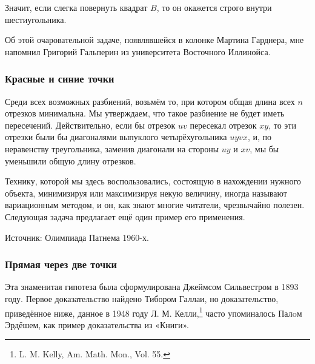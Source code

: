 Значит, если слегка повернуть квадрат $B$, то он окажется строго внутри шестиугольника.\heart

Об этой очаровательной задаче, появлявшейся в колонке Мартина Гарднера, мне напомнил Григорий Гальперин из университета Восточного Иллинойса.

\subsubsection*{Красные и синие точки}%

Среди всех возможных разбиений, возьмём то, при котором общая длина всех $n$ отрезков минимальна.
Мы утверждаем, что такое разбиение не будет иметь пересечений.
Действительно, если бы отрезок $uv$ пересекал отрезок $xy$, то эти отрезки были бы диагоналями выпуклого четырёхугольника $uyvx$, %
и, по неравенству треугольника, заменив диагонали на стороны $uy$ и $xv$, мы бы уменьшили общую длину отрезков.\heart

Технику, которой мы здесь воспользовались, состоящую в нахождении нужного объекта, минимизируя или максимизируя некую величину, иногда называют вариационным методом, и он, как знают многие читатели, чрезвычайно полезен.
Следующая задача предлагает ещё один пример его применения.

Источник: Олимпиада Патнема 1960-х.

\subsubsection*{Прямая через две точки}%

Эта знаменитая гипотеза была сформулирована Джеймсом Сильвестром в 1893 году.
Первое доказательство найдено Тибором Галлаи, %
но доказательство, приведённое ниже, данное в 1948 году Л. М. Келли,\footnote{L. M. Kelly, Am. Math. Mon., Vol. 55. %
} 
часто упоминалось Палoм Эрдёшем, как пример доказательства из «Книги».

